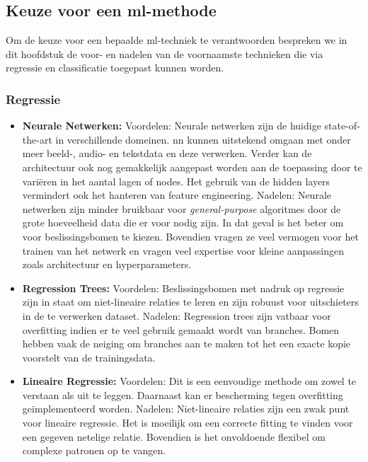 \subsection{Keuze voor een \gls{ml}-methode }	

Om de keuze voor een bepaalde \gls{ml}-techniek te verantwoorden bespreken we in dit hoofdstuk de voor- en nadelen van de voornaamste technieken die via regressie en classificatie toegepast kunnen worden.\cite{bron:mlalgoritmes}

	\subsubsection{Regressie}

	\begin{itemize}
		\item \textbf{Neurale Netwerken:}
			\subitem Voordelen: Neurale netwerken zijn de huidige state-of-the-art in verschillende domeinen. \gls{nn} kunnen uitstekend omgaan met onder meer beeld-, audio- en tekstdata en deze verwerken. Verder kan de architectuur ook nog gemakkelijk aangepast worden aan de toepassing door te vari\"eren in het aantal lagen of nodes. Het gebruik van de hidden layers vermindert ook het hanteren van feature engineering. 
			\subitem Nadelen: Neurale netwerken zijn minder bruikbaar voor \textit{general-purpose} algoritmes door de grote hoeveelheid data die er voor nodig zijn. In dat geval is het beter om voor beslissingsbomen te kiezen. Bovendien vragen ze veel vermogen voor het trainen van het netwerk en vragen veel expertise voor kleine aanpassingen zoals architectuur en hyperparameters. 
		\item \textbf{Regression Trees:}
			\subitem Voordelen: Beslissingsbomen met nadruk op regressie zijn in staat om niet-lineaire relaties te leren en zijn robuust voor uitschieters in de te verwerken dataset.
			\subitem Nadelen: Regression trees zijn vatbaar voor overfitting indien er te veel gebruik gemaakt wordt van branches. Bomen hebben vaak de neiging om branches aan te maken tot het een exacte kopie voorstelt van de trainingsdata.
		\item \textbf{Lineaire Regressie:}
			\subitem Voordelen: Dit is een eenvoudige methode om zowel te verstaan als uit te leggen. Daarnaast kan er bescherming tegen overfitting ge\"implementeerd worden. 
			\subitem Nadelen: Niet-lineaire relaties zijn een zwak punt voor lineaire regressie. Het is moeilijk om een correcte fitting te vinden voor een gegeven netelige relatie. Bovendien is het onvoldoende flexibel om complexe patronen op te vangen.

	\end{itemize}

